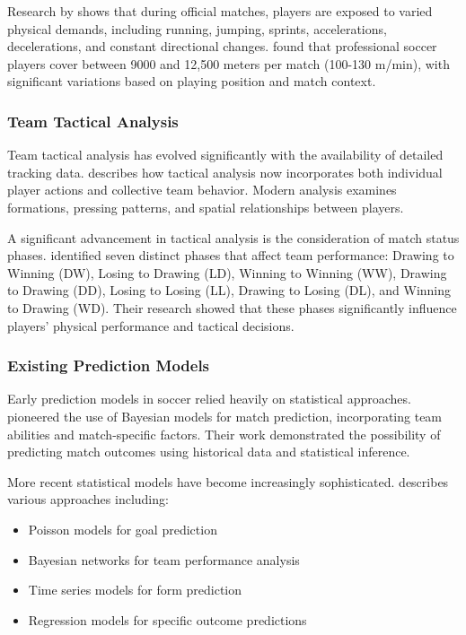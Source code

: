 \documentclass[10pt,journal,compsoc]{IEEEtran}
\begin{document}
Research by \cite{dambroz2022effect} shows that during official matches, players are exposed to varied physical demands, including running, jumping, sprints, accelerations, decelerations, and constant directional changes. \cite{konefal2023seven} found that professional soccer players cover between 9000 and 12,500 meters per match (100-130 m/min), with significant variations based on playing position and match context.

\subsubsection{Team Tactical Analysis}
Team tactical analysis has evolved significantly with the availability of detailed tracking data. \cite{pu2024orientation} describes how tactical analysis now incorporates both individual player actions and collective team behavior. Modern analysis examines formations, pressing patterns, and spatial relationships between players.

A significant advancement in tactical analysis is the consideration of match status phases. \cite{konefal2023seven} identified seven distinct phases that affect team performance: Drawing to Winning (DW), Losing to Drawing (LD), Winning to Winning (WW), Drawing to Drawing (DD), Losing to Losing (LL), Drawing to Losing (DL), and Winning to Drawing (WD). Their research showed that these phases significantly influence players' physical performance and tactical decisions.

\subsubsection{Existing Prediction Models}
Early prediction models in soccer relied heavily on statistical approaches. \cite{rue2000prediction} pioneered the use of Bayesian models for match prediction, incorporating team abilities and match-specific factors. Their work demonstrated the possibility of predicting match outcomes using historical data and statistical inference.

More recent statistical models have become increasingly sophisticated. \cite{wong2025predictive} describes various approaches including:
\begin{itemize}
    \item Poisson models for goal prediction
    \item Bayesian networks for team performance analysis
    \item Time series models for form prediction
    \item Regression models for specific outcome predictions
\end{itemize}
\end{document}

